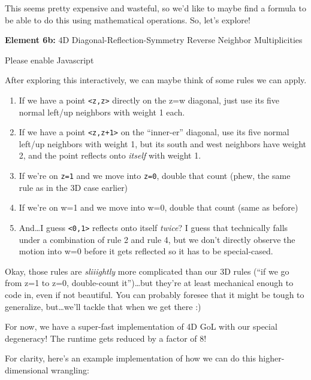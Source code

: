 \documentclass[]{article}
\begin{document}
This seems pretty expensive and wasteful, so we'd like to maybe find a formula
to be able to do this using mathematical operations. So, let's explore!

\leavevmode\hypertarget{golSyms4DReverse}{}%
\textbf{Element 6b:} 4D Diagonal-Reflection-Symmetry Reverse Neighbor
Multiplicities

\leavevmode\hypertarget{golSyms4DReverseCont}{}%
Please enable Javascript

After exploring this interactively, we can maybe think of some rules we can
apply.

\begin{enumerate}
\def\labelenumi{\arabic{enumi}.}
\tightlist
\item
  If we have a point \texttt{\textless{}z,z\textgreater{}} directly on the z=w
  diagonal, just use its five normal left/up neighbors with weight 1 each.
\item
  If we have a point \texttt{\textless{}z,z+1\textgreater{}} on the ``inner-er''
  diagonal, use its five normal left/up neighbors with weight 1, but its south
  and west neighbors have weight 2, and the point reflects onto \emph{itself}
  with weight 1.
\item
  If we're on \texttt{z=1} and we move into \texttt{z=0}, double that count
  (phew, the same rule as in the 3D case earlier)
\item
  If we're on w=1 and we move into w=0, double that count (same as before)
\item
  And\ldots I guess \texttt{\textless{}0,1\textgreater{}} reflects onto itself
  \emph{twice}? I guess that technically falls under a combination of rule 2 and
  rule 4, but we don't directly observe the motion into w=0 before it gets
  reflected so it has to be special-cased.
\end{enumerate}

Okay, those rules are \emph{sliiightly} more complicated than our 3D rules (``if
we go from z=1 to z=0, double-count it'')\ldots but they're at least mechanical
enough to code in, even if not beautiful. You can probably foresee that it might
be tough to generalize, but\ldots we'll tackle that when we get there :)

For now, we have a super-fast implementation of 4D GoL with our special
degeneracy! The runtime gets reduced by a factor of 8!

For clarity, here's an example implementation of how we can do this
higher-dimensional wrangling:
\end{document}
